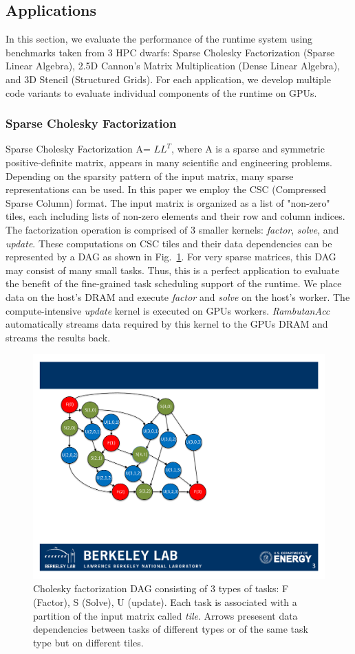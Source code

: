\subsection{Applications}
In this section, we evaluate the performance of the runtime system using benchmarks taken from 3 HPC dwarfs: Sparse Cholesky Factorization (Sparse Linear Algebra), 2.5D Cannon's Matrix Multiplication (Dense Linear Algebra), and 3D Stencil (Structured Grids).
For each application, we develop multiple code variants to evaluate individual components of the runtime on GPUs.

\subsubsection{Sparse Cholesky Factorization}
Sparse Cholesky Factorization A= $LL^T$, where A is a sparse and symmetric positive-definite matrix,
appears in many scientific and engineering problems.
Depending on the sparsity pattern of the input matrix, many sparse representations can be used.
In this paper we employ the CSC (Compressed Sparse Column) format. 
The input matrix is organized as a list of "non-zero" tiles, each including lists of non-zero elements and their row and column indices.
The factorization operation is comprised of 3 smaller kernels: {\em factor}, {\em solve}, and {\em update}.
These computations on CSC tiles and their data dependencies can be represented by a DAG as shown in Fig.~\ref{fig:cholesky}. 
For very sparse matrices, this DAG may consist of many small tasks.
Thus, this is a perfect application to evaluate the benefit of the fine-grained task scheduling support of the runtime.
We place data on the host's DRAM and execute {\em factor} and {\em solve} on the host's worker.
The compute-intensive {\em update} kernel is executed on GPUs workers.
{\em RambutanAcc} automatically streams data required by this kernel to the GPUs DRAM and streams the results back.

\begin{figure}[htb]
\centering
\includegraphics[width=.4\textwidth]{figures/cholesky.pdf}
\caption{Cholesky factorization DAG consisting of 3 types of tasks: F (Factor), S (Solve), U (update). Each task is associated with a partition of the input matrix called {\em tile}. Arrows presesent data dependencies between tasks of different types or of the same task type but on different tiles.}
\label{fig:cholesky}
\end{figure}


